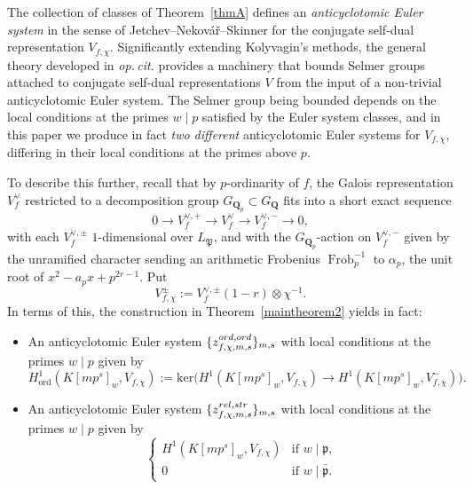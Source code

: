 \documentclass[10pt,letterpaper]{amsart}
\theoremstyle{plain}
\theoremstyle{definition}
\theoremstyle{definition}
\theoremstyle{plain}
\theoremstyle{plain}
\theoremstyle{plain}
\theoremstyle{remark}
\numberwithin{equation}{section}
\newcommand{\pp}{\mathfrak{p}}
\newcommand{\ppbar}{\bar{\mathfrak{p}}}
\newcommand{\relstr}{{{\rm rel},{\rm str}}}
\newcommand{\ord}{{{\rm ord},{\rm ord}}}
\DeclareMathOperator{\Frob}{\mathrm{Frob}}
\newcommand{\Q}{\mathbf{Q}}
\def\Ord{{\mathrm{ord}}}
\begin{document}
{The collection of classes of Theorem~\ref{thmA} defines an \emph{anticyclotomic Euler system} in the sense of Jetchev--Nekov{\'a}{\v{r}}--Skinner \cite{JNS} for the conjugate self-dual representation $V_{f,\chi}$. %
Significantly extending Kolyvagin's methods, the general theory developed in \emph{op.\,cit.} provides a machinery that bounds Selmer groups attached to conjugate self-dual representations $V$ from the input of a non-trivial anticyclotomic Euler system. %
The Selmer group being bounded depends on the local conditions at the primes $w\mid p$ satisfied by the Euler system classes, and 
in this paper we produce in fact \emph{two different} anticyclotomic Euler systems for $V_{f,\chi}$, differing in their local conditions at the primes above $p$.

To describe this further, recall that by $p$-ordinarity of $f$, the Galois representation $V_f^\vee$ restricted to a decomposition group $G_{\Q_p}\subset G_\Q$ fits into a short exact sequence
\[
0\rightarrow V_f^{\vee,+}\rightarrow V_f^\vee\rightarrow V_f^{\vee,-}\rightarrow 0,
\] 
with each $V_f^{\vee,\pm}$ $1$-dimensional over $L_\mathfrak{P}$, and with the $G_{\Q_p}$-action on $V_f^{\vee,-}$ given by the unramified character sending an arithmetic Frobenius $\Frob^{-1}_p$ to $\alpha_p$, the unit root of $x^2-a_px+p^{2r-1}$. Put 
\[
V_{f,\chi}^\pm:=V_f^{\vee,\pm}(1-r)\otimes\chi^{-1}.
\] 
In terms of this, the construction in Theorem~\ref{maintheorem2} yields in fact:
\begin{itemize}
\item An anticyclotomic Euler system %
$\{z_{f,\chi,m,s}^{\ord}\}_{m,s}$
%
with local conditions at the primes $w\mid p$ given by 
\[
H^1_{\Ord}(K[mp^s]_w,V_{f,\chi}):=\mathrm{ker}\bigl(H^1(K[mp^s]_w,V_{f,\chi})\rightarrow H^1(K[mp^s]_w,V_{f,\chi}^-)\bigr).
\]
\item An anticyclotomic Euler system %
$\{z_{f,\chi,m,s}^{\relstr}\}_{m,s}$ with local conditions at the primes $w\mid p$ given by
\begin{equation}\label{intro:rel-str}
\begin{cases}
H^1(K[mp^s]_w,V_{f,\chi})&\textrm{if $w\mid\pp$,}\\[0.2em]
0&\textrm{if $w\mid\ppbar$.}
\end{cases}\nonumber
\end{equation}
\end{itemize}

}
\end{document}

